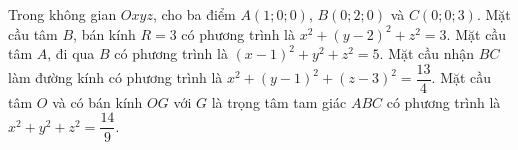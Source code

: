 \begin{ex}
Trong không gian $Oxyz$, cho ba điểm $A(1;0;0)$, $B(0;2;0)$ và $C(0;0;3)$.
\choiceTF
{Mặt cầu tâm $B$, bán kính $R=3$ có phương trình là $x^2+(y-2)^2+z^2=3$.}
{Mặt cầu tâm $A$, đi qua $B$ có phương trình là $(x-1)^2+y^2+z^2=5$.}
{Mặt cầu nhận $BC$ làm đường kính có phương trình là $x^2+(y-1)^2+(z-3)^2=\dfrac{13}{4}$.}
{Mặt cầu tâm $O$ và có bán kính $OG$ với $G$ là trọng tâm tam giác $ABC$ có phương trình là $x^2+y^2+z^2=\dfrac{14}{9}$.}
\end{ex}
